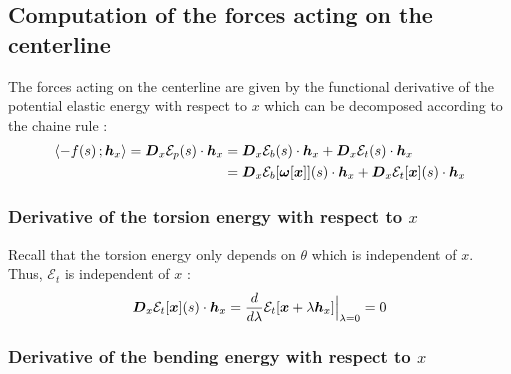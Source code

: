 \subsection{Computation of the forces acting on the centerline}

The forces acting on the centerline are given by the functional derivative of the potential elastic energy with respect to $x$ which can be decomposed according to the chaine rule :
\begin{equation}
	\begin{aligned}
	\langle -f(s)\,; \boldsymbol{h}_x\rangle = \boldsymbol{D}_x\mathcal{E}_p(s)\cdot\boldsymbol{h}_x 
	&= \boldsymbol{D}_x\mathcal{E}_b(s)\cdot\boldsymbol{h}_x + \boldsymbol{D}_x\mathcal{E}_t(s)\cdot\boldsymbol{h}_x \\
	&= \boldsymbol{D}_x\mathcal{E}_b[\boldsymbol{\omega}[\boldsymbol{x}]](s)\cdot\boldsymbol{h}_x + \boldsymbol{D}_x\mathcal{E}_t[\boldsymbol{x}](s)\cdot\boldsymbol{h}_x \\
	\end{aligned} 
\end{equation}

\subsubsection{Derivative of the torsion energy with respect to $x$}

Recall that the torsion energy only depends on $\theta$ which is independent of $x$. Thus, $\mathcal{E}_t$ is independent of $x$ :
\begin{equation}
	\boldsymbol{D}_x\mathcal{E}_t[\boldsymbol{x}](s)\cdot\boldsymbol{h}_x
		= \frac{d}{d\lambda} \mathcal{E}_t[\boldsymbol{x} + \lambda \boldsymbol{h}_x]\Bigr|_{\lambda = 0} = 0
\end{equation}

\subsubsection{Derivative of the bending energy with respect to $x$}

